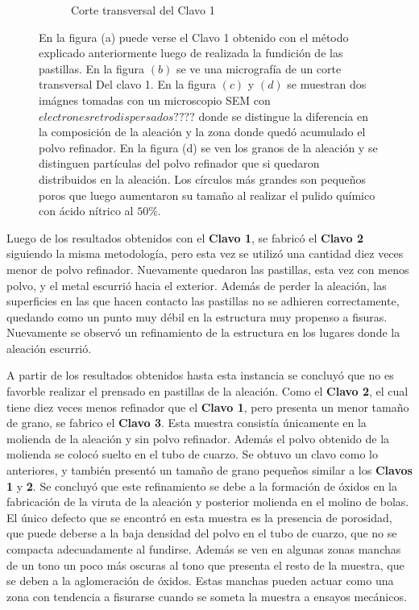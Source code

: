 \documentclass[a4paper,12pt,fleqn,twoside,openany]{book}
\begin{document}
\begin{figure}
\begin{subfigure}{0.2\textwidth}
        \caption{Corte transversal del Clavo 1}
        \label{fig:MicroClavo1}
    \end{subfigure}
    \caption{En la figura (a) puede verse el Clavo 1 obtenido con el método explicado anteriormente luego de realizada la fundición de las pastillas. En la figura $(b)$ se ve una micrografía de un corte transversal Del clavo 1. En la figura $(c)$ y $(d)$ se muestran dos imágnes tomadas con un microscopio SEM con $electrones retrodispersados????$ donde se distingue la diferencia en la composición de la aleación y la zona donde quedó acumulado el polvo refinador. En la figura (d) se ven los granos de la aleación y se distinguen partículas del polvo refinador que si quedaron distribuidos en la aleación. Los círculos más grandes son pequeños poros que luego aumentaron su tamaño al realizar el pulido químico con ácido nítrico al $50 \%$.}
    \end{figure}

Luego de los resultados obtenidos con el \textbf{Clavo 1}, se fabricó el \textbf{Clavo 2} siguiendo la misma metodología, pero esta vez se utilizó una cantidad diez veces menor de polvo refinador. Nuevamente quedaron las pastillas, esta vez con menos polvo, y el metal escurrió hacia el exterior. Además de perder la aleación, las superficies en las que hacen contacto las pastillas no se adhieren correctamente, quedando como un punto muy débil en la estructura muy propenso a fisuras. Nuevamente se observó un refinamiento de la estructura en los lugares donde la aleación escurrió.

A partir de los resultados obtenidos hasta esta instancia se concluyó que no es favorble realizar el prensado en pastillas de la aleación. Como el \textbf{Clavo 2}, el cual tiene diez veces menos refinador que el \textbf{Clavo 1}, pero presenta un menor tamaño de grano, se fabrico el \textbf{Clavo 3}. Esta muestra consistía únicamente en la molienda de la aleación y sin polvo refinador. Además el polvo obtenido de la molienda se colocó suelto en el tubo de cuarzo. Se obtuvo un clavo como lo anteriores, y también presentó un tamaño de grano pequeños similar a los \textbf{Clavos 1} y \textbf{2}. Se concluyó que este refinamiento se debe a la formación de óxidos en la fabricación de la viruta de la aleación y posterior molienda en el molino de bolas. El único defecto que se encontró en esta muestra es la presencia de porosidad, que puede deberse a la baja densidad del polvo en el tubo de cuarzo, que no se compacta adecuadamente al fundirse. Además se ven en algunas zonas manchas de un tono un poco más oscuras al tono que presenta el resto de la muestra, que se deben a la aglomeración de óxidos. Estas manchas pueden actuar como una zona con tendencia a fisurarse cuando se someta la muestra a ensayos mecánicos. 
\end{document}
